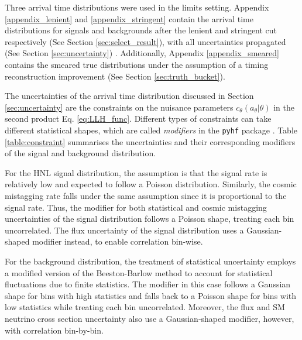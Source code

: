 Three arrival time distributions were used in the limits setting.
Appendix \ref{appendix_lenient} and \ref{appendix_stringent} contain the arrival time distributions for signals and backgrounds after the lenient and stringent cut respectively (See Section \ref{sec:select_result}), with all uncertainties propagated (See Section \ref{sec:uncertainty}) . 
Additionally, Appendix \ref{appendix_smeared} contains the smeared true distributions under the assumption of a timing reconstruction improvement (See Section \ref{sec:truth_bucket}).

The uncertainties of the arrival time distribution discussed in Section \ref{sec:uncertainty} are the constraints on the nuisance parameters $c_\theta(a_\theta|\theta)$ in the second product Eq. \ref{eq:LLH_func}.
Different types of constraints can take different statistical shapes, which are called \textit{modifiers} in the \texttt{pyhf} package \cite{pyhf_joss}.
Table \ref{table:constraint} summarises the uncertainties and their corresponding modifiers of the signal and background distribution.

For the HNL signal distribution, the assumption is that the signal rate is relatively low and expected to follow a Poisson distribution.
Similarly, the cosmic mistagging rate falls under the same assumption since it is proportional to the signal rate. 
Thus, the modifier for both statistical and cosmic mistagging uncertainties of the signal distribution follows a Poisson shape, treating each bin uncorrelated. 
The flux uncertainty of the signal distribution uses a Gaussian-shaped modifier instead, to enable correlation bin-wise.

For the background distribution, the treatment of statistical uncertainty employs a modified version of the Beeston-Barlow method \cite{BeestonBarlow} to account for statistical fluctuations due to finite statistics.
The modifier in this case follows a Gaussian shape for bins with high statistics and falls back to a Poisson shape for bins with low statistics while treating each bin uncorrelated.
Moreover, the flux and SM neutrino cross section uncertainty also use a Gaussian-shaped modifier, however, with correlation bin-by-bin.

